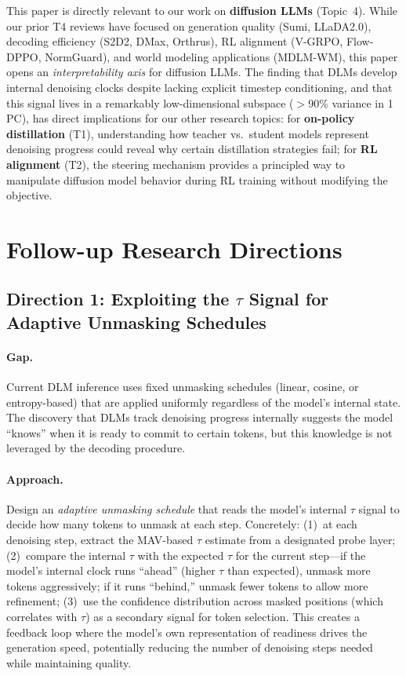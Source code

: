 \documentclass[11pt,a4paper]{article}
\begin{document}
This paper is directly relevant to our work on \textbf{diffusion LLMs} (Topic~4). While our prior T4 reviews have focused on generation quality (Sumi, LLaDA2.0), decoding efficiency (S2D2, DMax, Orthrus), RL alignment (V-GRPO, Flow-DPPO, NormGuard), and world modeling applications (MDLM-WM), this paper opens an \emph{interpretability axis} for diffusion LLMs. The finding that DLMs develop internal denoising clocks despite lacking explicit timestep conditioning, and that this signal lives in a remarkably low-dimensional subspace ($>$90\% variance in 1 PC), has direct implications for our other research topics: for \textbf{on-policy distillation} (T1), understanding how teacher vs.\ student models represent denoising progress could reveal why certain distillation strategies fail; for \textbf{RL alignment} (T2), the steering mechanism provides a principled way to manipulate diffusion model behavior during RL training without modifying the objective.

\section{Follow-up Research Directions}

\subsection{Direction 1: Exploiting the $\tau$ Signal for Adaptive Unmasking Schedules}

\paragraph{Gap.}
Current DLM inference uses fixed unmasking schedules (linear, cosine, or entropy-based) that are applied uniformly regardless of the model's internal state. The discovery that DLMs track denoising progress internally suggests the model ``knows'' when it is ready to commit to certain tokens, but this knowledge is not leveraged by the decoding procedure.

\paragraph{Approach.}
Design an \emph{adaptive unmasking schedule} that reads the model's internal $\tau$ signal to decide how many tokens to unmask at each step. Concretely: (1)~at each denoising step, extract the MAV-based $\tau$ estimate from a designated probe layer; (2)~compare the internal $\tau$ with the expected $\tau$ for the current step---if the model's internal clock runs ``ahead'' (higher $\tau$ than expected), unmask more tokens aggressively; if it runs ``behind,'' unmask fewer tokens to allow more refinement; (3)~use the confidence distribution across masked positions (which correlates with $\tau$) as a secondary signal for token selection. This creates a feedback loop where the model's own representation of readiness drives the generation speed, potentially reducing the number of denoising steps needed while maintaining quality.
\end{document}
